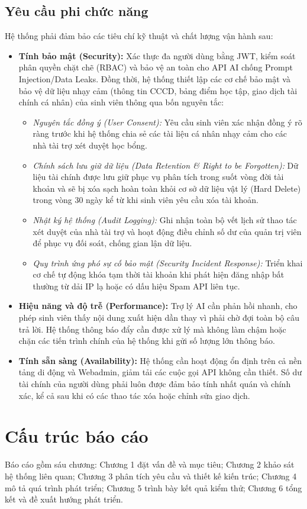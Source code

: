 \subsection{Yêu cầu phi chức năng}
Hệ thống phải đảm bảo các tiêu chí kỹ thuật và chất lượng vận hành sau:
\begin{itemize}
    \item \textbf{Tính bảo mật (Security):} Xác thực đa người dùng bằng JWT, kiểm soát phân quyền chặt chẽ (RBAC) và bảo vệ an toàn cho API AI chống Prompt Injection/Data Leaks. Đồng thời, hệ thống thiết lập các cơ chế bảo mật và bảo vệ dữ liệu nhạy cảm (thông tin CCCD, bảng điểm học tập, giao dịch tài chính cá nhân) của sinh viên thông qua bốn nguyên tắc:
    \begin{itemize}
        \item \textit{Nguyên tắc đồng ý (User Consent):} Yêu cầu sinh viên xác nhận đồng ý rõ ràng trước khi hệ thống chia sẻ các tài liệu cá nhân nhạy cảm cho các nhà tài trợ xét duyệt học bổng.
        \item \textit{Chính sách lưu giữ dữ liệu (Data Retention \& Right to be Forgotten):} Dữ liệu tài chính được lưu giữ phục vụ phân tích trong suốt vòng đời tài khoản và sẽ bị xóa sạch hoàn toàn khỏi cơ sở dữ liệu vật lý (Hard Delete) trong vòng 30 ngày kể từ khi sinh viên yêu cầu xóa tài khoản.
        \item \textit{Nhật ký hệ thống (Audit Logging):} Ghi nhận toàn bộ vết lịch sử thao tác xét duyệt của nhà tài trợ và hoạt động điều chỉnh số dư của quản trị viên để phục vụ đối soát, chống gian lận dữ liệu.
        \item \textit{Quy trình ứng phó sự cố bảo mật (Security Incident Response):} Triển khai cơ chế tự động khóa tạm thời tài khoản khi phát hiện đăng nhập bất thường từ dải IP lạ hoặc có dấu hiệu Spam API liên tục.
    \end{itemize}
    \item \textbf{Hiệu năng và độ trễ (Performance):} Trợ lý AI cần phản hồi nhanh, cho phép sinh viên thấy nội dung xuất hiện dần thay vì phải chờ đợi toàn bộ câu trả lời. Hệ thống thông báo đẩy cần được xử lý mà không làm chậm hoặc chặn các tiến trình chính của hệ thống khi gửi số lượng lớn thông báo.
    \item \textbf{Tính sẵn sàng (Availability):} Hệ thống cần hoạt động ổn định trên cả nền tảng di động và Webadmin, giảm tải các cuộc gọi API không cần thiết. Số dư tài chính của người dùng phải luôn được đảm bảo tính nhất quán và chính xác, kể cả sau khi có các thao tác xóa hoặc chỉnh sửa giao dịch.
\end{itemize}

\section{Cấu trúc báo cáo}
Báo cáo gồm sáu chương: Chương 1 đặt vấn đề và mục tiêu; Chương 2 khảo sát hệ thống liên quan; Chương 3 phân tích yêu cầu và thiết kế kiến trúc; Chương 4 mô tả quá trình phát triển; Chương 5 trình bày kết quả kiểm thử; Chương 6 tổng kết và đề xuất hướng phát triển.

